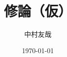 \documentclass{ltjsarticle}
\begin{document}
\title{修論（仮）}
\author{中村友哉}
\date{\today}
\maketitle
\clearpage
\tableofcontents
\clearpage










\end{document}
